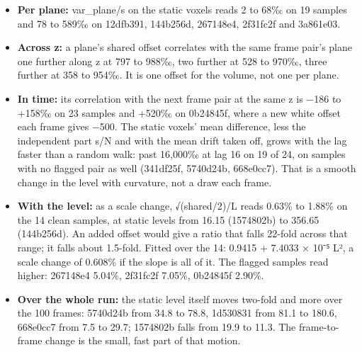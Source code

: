 \begin{enumerate}
\begin{itemize}
\item \textbf{Per plane:} var\_\allowbreak{}plane/s on the static voxels reads 2 to 68‰ on 19 samples and 78 to 589‰ on 12dfb391, 144b256d, 267148e4, 2f31fc2f and 3a861e03.
\item \textbf{Across z:} a plane's shared offset correlates with the same frame pair's plane one further along z at 797 to 988‰, two further at 528 to 970‰, three further at 358 to 954‰. It is one offset for the volume, not one per plane.
\item \textbf{In time:} its correlation with the next frame pair at the same z is −186 to +158‰ on 23 samples and +520‰ on 0b24845f, where a new white offset each frame gives −500. The static voxels' mean difference, less the independent part s/N and with the mean drift taken off, grows with the lag faster than a random walk: past 16,000‰ at lag 16 on 19 of 24, on samples with no flagged pair as well (341df25f, 5740d24b, 668e0cc7). That is a smooth change in the level with curvature, not a draw each frame.
\item \textbf{With the level:} as a scale change, √(shared/2)/L reads 0.63\% to 1.88\% on the 14 clean samples, at static levels from 16.15 (1574802b) to 356.65 (144b256d). An added offset would give a ratio that falls 22-fold across that range; it falls about 1.5-fold. Fitted over the 14: 0.9415 + 7.4033 × 10⁻⁵ L², a scale change of 0.608\% if the slope is all of it. The flagged samples read higher: 267148e4 5.04\%, 2f31fc2f 7.05\%, 0b24845f 2.90\%.
\item \textbf{Over the whole run:} the static level itself moves two-fold and more over the 100 frames: 5740d24b from 34.8 to 78.8, 1d530831 from 81.1 to 180.6, 668e0cc7 from 7.5 to 29.7; 1574802b falls from 19.9 to 11.3. The frame-to-frame change is the small, fast part of that motion.
\end{itemize}


\end{enumerate}

